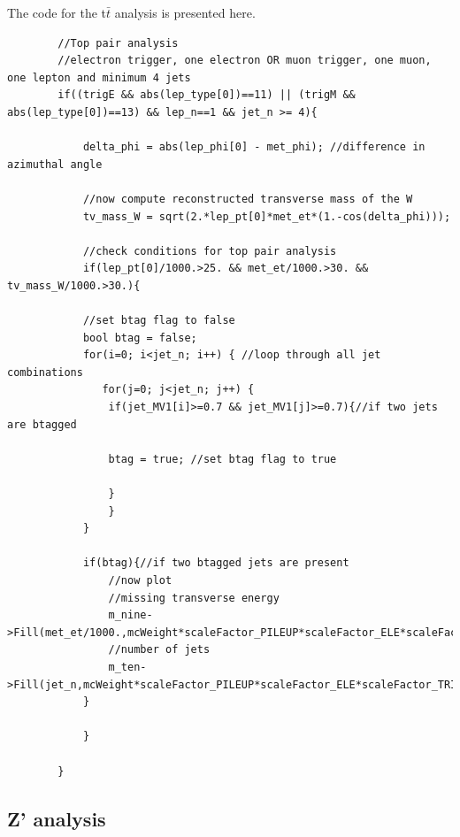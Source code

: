 \documentclass[runningheads,a4paper]{llncs}
\begin{document}
\fontsize{7}{5}\selectfont
The code for the t$\bar{t}$ analysis is presented here.
\begin{verbatim}
		//Top pair analysis
		//electron trigger, one electron OR muon trigger, one muon, one lepton and minimum 4 jets
		if((trigE && abs(lep_type[0])==11) || (trigM && abs(lep_type[0])==13) && lep_n==1 && jet_n >= 4){

			delta_phi = abs(lep_phi[0] - met_phi); //difference in azimuthal angle

			//now compute reconstructed transverse mass of the W
			tv_mass_W = sqrt(2.*lep_pt[0]*met_et*(1.-cos(delta_phi))); 

			//check conditions for top pair analysis
			if(lep_pt[0]/1000.>25. && met_et/1000.>30. && tv_mass_W/1000.>30.){ 
				
			//set btag flag to false
			bool btag = false;
			for(i=0; i<jet_n; i++) { //loop through all jet combinations
			   for(j=0; j<jet_n; j++) {
				if(jet_MV1[i]>=0.7 && jet_MV1[j]>=0.7){//if two jets are btagged

				btag = true; //set btag flag to true

				}
			    }
			}

			if(btag){//if two btagged jets are present
				//now plot			
				//missing transverse energy
				m_nine->Fill(met_et/1000.,mcWeight*scaleFactor_PILEUP*scaleFactor_ELE*scaleFactor_TRIGGER);
				//number of jets
				m_ten->Fill(jet_n,mcWeight*scaleFactor_PILEUP*scaleFactor_ELE*scaleFactor_TRIGGER);
			}

			}

		}
\end{verbatim}
\subsection{Z' analysis}
\end{document}
